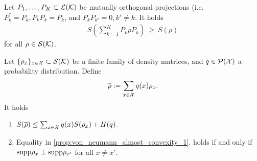   \begin{proposition}\label{prop:von_neumann_pinching_mon}
  	Let $P_1,\dots,P_K \subset {\mathcal L}({\mathcal K})$ be mutually orthogonal projections (i.e. $P_k^\ast = P_k, P_kP_k = P_k$, and $P_kP_{k'} = 0, k' \neq k$. It holds
  	\begin{align}
  	S(\sum_{k=1}^K P_k \rho P_k) \ \geq \ S(\rho)
  	\end{align}
  	for all $\rho \in {\mathcal S}({\mathcal K})$.
  \end{proposition}
  
  \begin{proposition} \label{prop:von_neumann_almost_convexity}
   Let $\{\rho_x\}_{x \in {\mathcal X}} \subset {\mathcal S}({\mathcal K})$ be a finite family of density matrices, and $q \in {\mathcal P}({\mathcal X})$ a probability distribution. Define 
   \begin{align}
    \overline{\rho} := \sum_{x \in {\mathcal X}} q(x) \rho_x. 
   \end{align}
   It holds
   \begin{enumerate}
    \item $S(\overline{\rho}) \leq \sum_{x \in {\mathcal X}} q(x) S(\rho_x) + H(q)$. \label{prop:von_neumann_almost_convexity_1}
    \item Equality in \ref{prop:von_neumann_almost_convexity_1}. holds if and only if $\mathrm{supp} \rho_x \perp \mathrm{supp} \rho_{x'}$ for all $x \neq x'$.
   \end{enumerate}
  \end{proposition}

